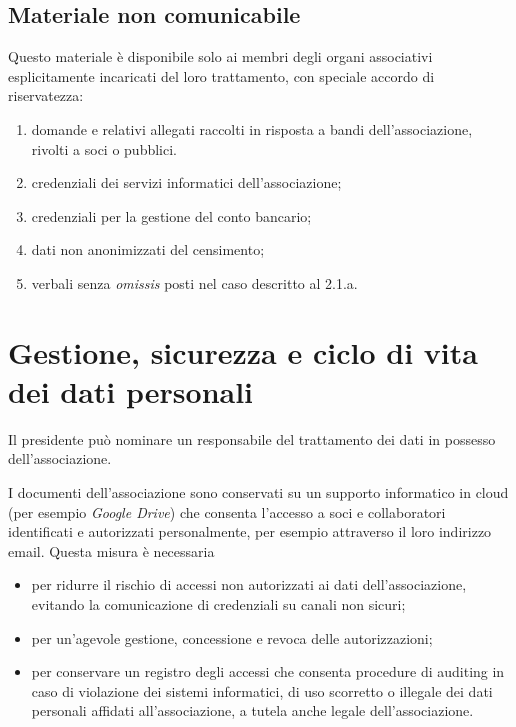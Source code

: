 \subsection{Materiale non comunicabile}\label{materiale-non-comunicabile}

Questo materiale è disponibile solo ai membri degli organi associativi
esplicitamente incaricati del loro trattamento,
con speciale accordo di riservatezza:

\begin{enumerate}
    \item
        domande e relativi allegati raccolti in risposta a bandi
        dell'associazione, rivolti a soci o pubblici.
    \item
        credenziali dei servizi informatici dell'associazione;
    \item
        credenziali per la gestione del conto bancario;
    \item
        dati non anonimizzati del censimento;
    \item
        verbali senza \emph{omissis} posti nel caso descritto al 2.1.a.
\end{enumerate}

\section{Gestione, sicurezza e ciclo di vita dei dati personali}

Il presidente può nominare un responsabile del trattamento dei dati in possesso
dell'associazione.

I documenti dell'associazione sono conservati su un supporto informatico in
cloud (per esempio \emph{Google Drive}) che consenta l'accesso a soci e
collaboratori identificati e autorizzati personalmente, per esempio
attraverso il loro indirizzo email.
Questa misura è necessaria 
\begin{itemize}
    \item per ridurre il rischio di accessi non
autorizzati ai dati dell'associazione, evitando la comunicazione di
credenziali su canali non sicuri;
\item per un'agevole gestione, concessione e revoca delle autorizzazioni;
\item per conservare un registro degli accessi che consenta procedure di
    auditing in caso di violazione dei sistemi informatici, di uso scorretto
    o illegale dei dati personali affidati all'associazione, a tutela anche
    legale dell'associazione.
\end{itemize}

